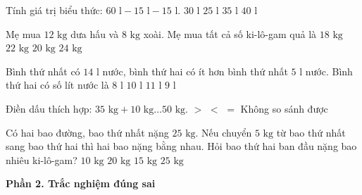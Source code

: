 \begin{ex} %
Tính giá trị biểu thức: $60\text{ l} - 15\text{ l} - 15\text{ l}$.
\choice
{\True $30\text{ l}$}
{$25\text{ l}$}
{$35\text{ l}$}
{$40\text{ l}$}
\end{ex}

\begin{ex} %
Mẹ mua $12\text{ kg}$ dưa hấu và $8\text{ kg}$ xoài. Mẹ mua tất cả số ki-lô-gam quả là
\choice
{$18\text{ kg}$}
{$22\text{ kg}$}
{\True $20\text{ kg}$}
{$24\text{ kg}$}
\end{ex}

\begin{ex} %
Bình thứ nhất có $14\text{ l}$ nước, bình thứ hai có ít hơn bình thứ nhất $5\text{ l}$ nước. Bình thứ hai có số lít nước là
\choice
{$8\text{ l}$}
{$10\text{ l}$}
{$11\text{ l}$}
{\True $9\text{ l}$}
\end{ex}

\begin{ex} %
Điền dấu thích hợp: $35\text{ kg} + 10\text{ kg} \dots 50\text{ kg}$.
\choice
{$>$}
{\True $<$}
{$=$}
{Không so sánh được}
\end{ex}

\begin{ex} %
Có hai bao đường, bao thứ nhất nặng $25\text{ kg}$. Nếu chuyển $5\text{ kg}$ từ bao thứ nhất sang bao thứ hai thì hai bao nặng bằng nhau. Hỏi bao thứ hai ban đầu nặng bao nhiêu ki-lô-gam?
\choice
{$10\text{ kg}$}
{$20\text{ kg}$}
{\True $15\text{ kg}$}
{$25\text{ kg}$}
\end{ex}

\textbf{Phần 2. Trắc nghiệm đúng sai}

